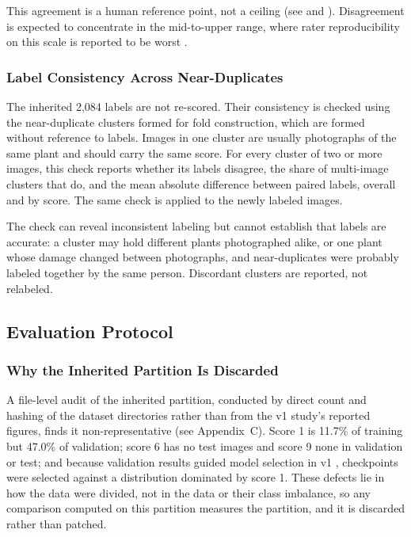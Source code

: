 \documentclass{icsthesis}
\newcommand{\secref}[1]{\textit{\nameref{#1}}}
\begin{document}
\begin{mainmatter}
					This agreement is a human reference point, not a ceiling (see \secref{sec:scope} and \secref{sec:humanref}). Disagreement is
					expected to concentrate in the mid-to-upper range, where rater reproducibility
					on this scale is reported to be worst \citep{srinivasan2022}.

				\subsubsection{Label Consistency Across Near-Duplicates}\label{sec:consistency}

					The inherited 2,084 labels are not re-scored. Their consistency is checked using
					the near-duplicate clusters formed for fold construction, which are formed
					without reference to labels. Images in one cluster are usually photographs of
					the same plant and should carry the same score. For every cluster of two or more
					images, this check reports whether its labels disagree, the share of multi-image
					clusters that do, and the mean absolute difference between paired labels,
					overall and by score. The same check is applied to the newly labeled images.

					The check can reveal inconsistent labeling but cannot establish that
					labels are accurate: a cluster may hold different plants
					photographed alike, or one plant whose damage changed between
					photographs, and near-duplicates were probably labeled together by
					the same person. Discordant clusters are reported, not relabeled.

			\subsection{Evaluation Protocol}\label{sec:protocol}

				\subsubsection{Why the Inherited Partition Is Discarded}\label{sec:discard}

					A file-level audit of the inherited partition, conducted by direct
					count and hashing of the dataset directories rather than from the v1
					study's reported figures, finds it non-representative (see
					Appendix~C). Score 1 is 11.7\% of training but 47.0\% of
					validation; score 6 has no test images and score 9 none in
					validation or test; and because validation results guided model
					selection in v1 \citep{casasola2026}, checkpoints were selected
					against a distribution dominated by score 1. These defects lie in
					how the data were divided, not in the data or their class imbalance,
					so any comparison computed on this partition measures the partition,
					and it is discarded rather than patched.


\end{mainmatter}
\end{document}
